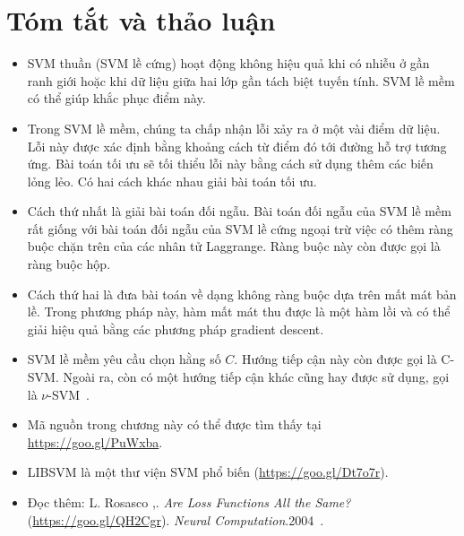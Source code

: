 \section{Tóm tắt và thảo luận }
\begin{itemize}
\item SVM thuần (SVM lề cứng) hoạt động không hiệu quả khi có nhiễu
ở gần ranh giới hoặc khi dữ liệu giữa hai lớp gần tách biệt tuyến tính. SVM lề mềm có thể giúp khắc phục điểm này.

\item Trong SVM lề mềm, chúng ta chấp nhận lỗi xảy ra ở
một
vài điểm dữ liệu. Lỗi này được xác định bằng khoảng cách từ điểm đó tới
đường hỗ trợ tương ứng. Bài toán tối ưu sẽ tối thiểu lỗi này bằng
cách sử dụng thêm các biến lỏng lẻo. Có hai cách khác nhau giải bài toán tối ưu.

\item Cách thứ nhất là giải bài toán đối ngẫu. Bài toán đối ngẫu của
SVM lề mềm rất giống với bài toán đối ngẫu của SVM lề cứng ngoại trừ việc có thêm ràng buộc chặn trên của các nhân tử Laggrange. Ràng buộc này còn được gọi là ràng buộc hộp.

\item Cách thứ hai là đưa bài toán về dạng không ràng buộc dựa trên mất mát bản lề. Trong phương pháp này, hàm mất mát thu được là một
hàm lồi và có thể giải hiệu quả bằng các phương pháp gradient    descent.

\item SVM lề mềm yêu cầu chọn hằng số $C$. Hướng tiếp cận này còn được gọi là C-SVM. Ngoài ra, còn có một hướng tiếp cận khác cũng hay được sử dụng, gọi là
$\nu$-SVM~\cite{scholkopf2000new}.

\item Mã nguồn trong chương này có thể được tìm thấy tại
\url{https://goo.gl/PuWxba}.

\item LIBSVM là một thư viện SVM phổ biến  (\url{https://goo.gl/Dt7o7r}).

\item {Đọc thêm:} L. Rosasco \etal,.
{\textit{Are Loss
Functions All the Same?}} (\url{https://goo.gl/QH2Cgr}). \textit{Neural
Computation}.2004~\cite{rosasco2004loss}.
\end{itemize}
